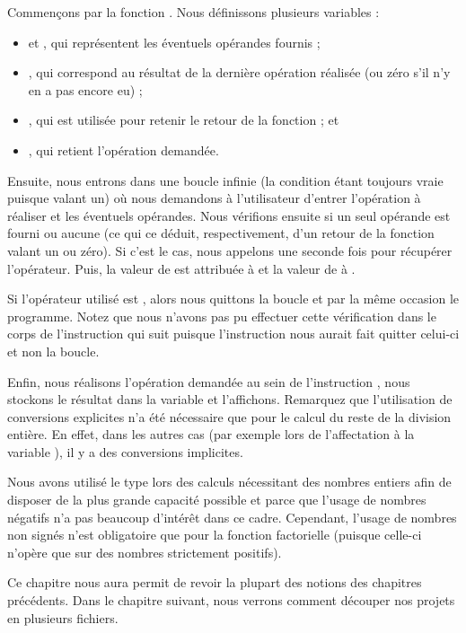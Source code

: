 Commençons par la fonction . Nous définissons plusieurs
variables :

\begin{itemize}
\item
   et , qui représentent les éventuels opérandes
  fournis ;
\item
  , qui correspond au résultat de la dernière opération
  réalisée (ou zéro s'il n'y en a pas encore eu) ;
\item
  , qui est utilisée pour retenir le retour de la fonction
   ; et
\item
  , qui retient l'opération demandée.
\end{itemize}

Ensuite, nous entrons dans une boucle infinie (la condition étant
toujours vraie puisque valant un) où nous demandons à l'utilisateur
d'entrer l'opération à réaliser et les éventuels opérandes. Nous
vérifions ensuite si un seul opérande est fourni ou aucune (ce qui ce
déduit, respectivement, d'un retour de la fonction 
valant un ou zéro). Si c'est le cas, nous appelons une seconde fois
 pour récupérer l'opérateur. Puis, la valeur de
 est attribuée à  et la valeur de  à
.

Si l'opérateur utilisé est , alors nous quittons la boucle et
par la même occasion le programme. Notez que nous n'avons pas pu
effectuer cette vérification dans le corps de l'instruction
 qui suit puisque l'instruction  nous
aurait fait quitter celui-ci et non la boucle.

Enfin, nous réalisons l'opération demandée au sein de l'instruction
, nous stockons le résultat dans la variable 
et l'affichons. Remarquez que l'utilisation de conversions explicites
n'a été nécessaire que pour le calcul du reste de la division entière.
En effet, dans les autres cas (par exemple lors de l'affectation à la
variable ), il y a des conversions implicites.

\begin{infobox}
 Nous avons utilisé le type  lors des calculs nécessitant des nombres entiers
afin de disposer de la plus grande capacité possible et parce que
l'usage de nombres négatifs n'a pas beaucoup d'intérêt dans ce cadre.
Cependant, l'usage de nombres non signés n'est obligatoire que pour la
fonction factorielle (puisque celle-ci n'opère que sur des nombres
strictement positifs).
\end{infobox}

\hrulefill

Ce chapitre nous aura permit de revoir la plupart
des notions des chapitres précédents. Dans le chapitre suivant, nous
verrons comment découper nos projets en plusieurs fichiers.